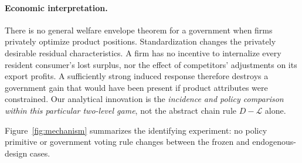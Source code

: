 \documentclass[11pt,a4paper]{article}
\theoremstyle{remark}\newtheorem{remark}[theorem]{Remark}
\newcommand{\loss}{\mathcal L}\newcommand{\vect}[1]{\boldsymbol{#1}}
\begin{document}
\paragraph{Economic interpretation.}
There is no general welfare envelope theorem for a government when firms privately optimize product positions. Standardization changes the privately desirable residual characteristics. A firm has no incentive to internalize every resident consumer's lost surplus, nor the effect of competitors' adjustments on its export profits. A sufficiently strong induced response therefore destroys a government gain that would have been present if product attributes were constrained. Our analytical innovation is the \emph{incidence and policy comparison within this particular two-level game}, not the abstract chain rule $D-\loss$ alone.

Figure~\ref{fig:mechanism} summarizes the identifying experiment: no policy primitive or government voting rule changes between the frozen and endogenous-design cases.
\end{document}
